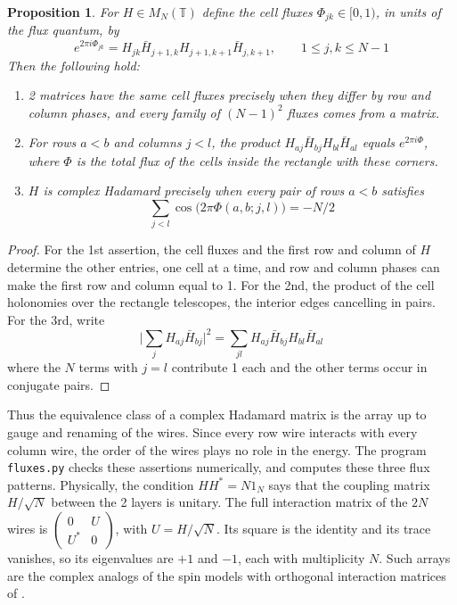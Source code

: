 \documentclass[11pt,a4paper]{article}
\newtheorem{prop}[thm]{Proposition}
\theoremstyle{remark}
\begin{document}
\begin{samepage}
\begin{prop}\label{prop:fluxes}
For $H\in M_N(\mathbb T)$ define the cell fluxes $\Phi_{jk}\in[0,1)$, in units of the flux quantum, by
\[
 e^{2\pi i\Phi_{jk}}=H_{jk}\bar H_{j+1,k}H_{j+1,k+1}\bar H_{j,k+1},\qquad 1\leq j,k\leq N-1
\]
Then the following hold:
\begin{enumerate}
\item 2 matrices have the same cell fluxes precisely when they differ by row and column phases, and every family of $(N-1)^2$ fluxes comes from a matrix.

\item For rows $a<b$ and columns $j<l$, the product $H_{aj}\bar H_{bj}H_{bl}\bar H_{al}$ equals $e^{2\pi i\Phi}$, where $\Phi$ is the total flux of the cells inside the rectangle with these corners.

\item $H$ is complex Hadamard precisely when every pair of rows $a<b$ satisfies
\[
 \sum_{j<l}\cos\big(2\pi\Phi(a,b;j,l)\big)=-N/2
\]
\end{enumerate}
\end{prop}
\end{samepage}
\begin{proof}
For the 1st assertion, the cell fluxes and the first row and column of $H$ determine the other entries, one cell at a time, and row and column phases can make the first row and column equal to 1. For the 2nd, the product of the cell holonomies over the rectangle telescopes, the interior edges cancelling in pairs. For the 3rd, write
\[
 \Big|\sum_jH_{aj}\bar H_{bj}\Big|^2=\sum_{jl}H_{aj}\bar H_{bj}H_{bl}\bar H_{al}
\]
where the $N$ terms with $j=l$ contribute 1 each and the other terms occur in conjugate pairs.
\end{proof}

Thus the equivalence class of a complex Hadamard matrix is the array up to gauge and renaming of the wires. Since every row wire interacts with every column wire, the order of the wires plays no role in the energy. The program \texttt{fluxes.py} checks these assertions numerically, and computes these three flux patterns. Physically, the condition $HH^*=N1_N$ says that the coupling matrix $H/\sqrt N$ between the 2 layers is unitary. The full interaction matrix of the $2N$ wires is $\left(\begin{smallmatrix}0&U\\U^*&0\end{smallmatrix}\right)$, with $U=H/\sqrt N$. Its square is the identity and its trace vanishes, so its eigenvalues are $+1$ and $-1$, each with multiplicity $N$. Such arrays are the complex analogs of the spin models with orthogonal interaction matrices of \cite{mp2,ppo}.
\end{document}
